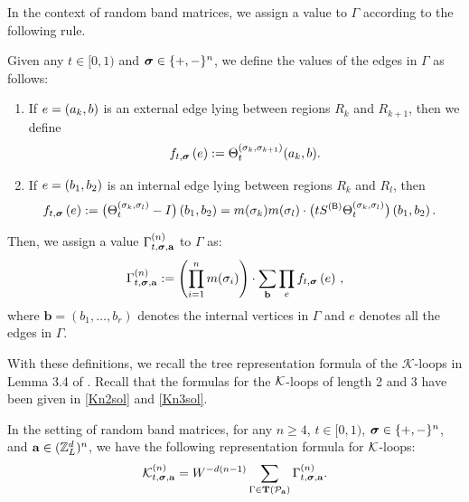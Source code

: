 In the context of random band matrices, we assign a value to $\Gamma$ according to the following rule.
 
\begin{definition}%
Given any $t\in [0,1)$ and $\bsig\in\{+,-\}^n$, we define the values of the edges in $\Gamma$ as follows:
  \begin{enumerate}
    \item If $e = \p{a_k, b}$ is an external edge lying between regions $R_k$ and $R_{k+1}$, then we define 
      \begin{equation}\label{f-external}
        f_{t,\bsig}\p{e} := \Theta^{(\sig_k,\sig_{k+1})}_{t}(a_k,b).
      \end{equation}
    \item If $e = \p{b_1, b_2}$ is an internal edge lying between regions $R_k$ and $R_{l}$, then 
      \begin{equation}\label{f-internal}
      \begin{aligned}
        f_{t,\bsig}\p{e}
          &:= \big(\Theta^{(\sig_k,\sig_l)}_{t}-I\big) \p{b_1, b_2} = m(\sig_k)m(\sig_{l})\cdot \big(tS^{(\sB)} \Theta^{(\sig_k,\sig_l)}_{t}\big)\p{b_1,b_2}.
          \end{aligned}
      \end{equation}
  \end{enumerate}
Then, we assign a value $\Gamma^{(n)}_{t,\bsig,\ba}$ to  $\Gamma$ as:
\begin{equation}\label{M-graph-value-unsummed}
\Gamma^{(n)}_{t,\bsig,\ba} := \p{\prod_{i=1}^n m(\sig_i)} \cdot \sum_{\mathbf b} \prod_{e} f_{t,\bsig}\p{e}    \, ,
\end{equation}
where $\mathbf b=(b_1,\ldots,b_{r})$ denotes the internal vertices in $\Gamma$ and $e$ denotes all the edges in $\Gamma$. 
\end{definition}




With these definitions, we recall the tree representation formula of the $\mathcal{K}$-loops in Lemma 3.4 of \cite{YY_25}. Recall that the formulas for the $\cal K$-loops of length 2 and 3 have been given in \eqref{Kn2sol} and \eqref{Kn3sol}.

\begin{lemma}\label{tree-representation}
In the setting of random band matrices, for any $n\ge 4$, $t\in[0,1)$, $\bsig\in \{+,-\}^n$, and $\ba\in (\Zn)^n$, we have the following representation formula for $\cal K$-loops:
  \begin{equation}\label{eq_Ktree}
\cK_{t,\bsig,\ba}^{(n)}
      =W^{-d(n-1)} \sum_{\Gamma \in \TSP\p{\mathcal{P}_{\ba}}} \Gamma^{(n)}_{t,\bsig,\ba}.
  \end{equation}
\end{lemma}

